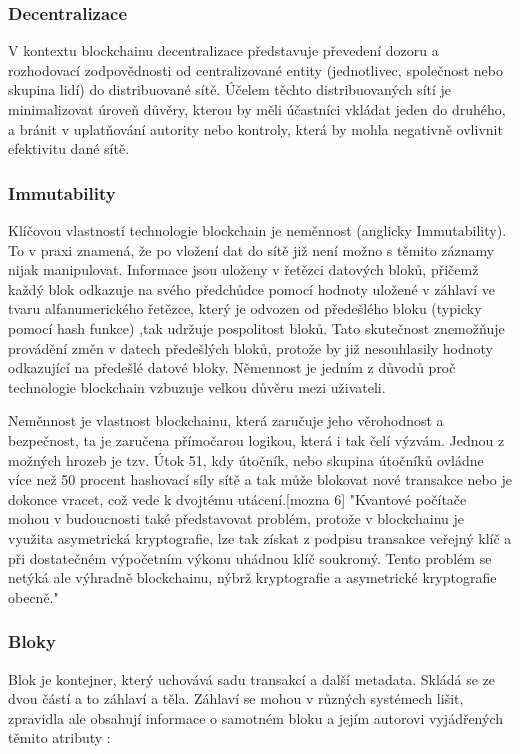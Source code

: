 \subsubsection{Decentralizace}\label{subsubsec:Decentralization}
V kontextu blockchainu decentralizace představuje převedení dozoru a rozhodovací zodpovědnosti od centralizované entity (jednotlivec, společnost nebo skupina lidí) do distribuované sítě. Účelem těchto distribuovaných sítí je minimalizovat úroveň důvěry, kterou by měli účastníci vkládat jeden do druhého, a bránit v uplatňování autority nebo kontroly, která by mohla negativně ovlivnit efektivitu dané sítě. \cite{Decentralizace-blockchainu}




\subsubsection{Immutability}\label{subsubsec:immutability}
Klíčovou vlastností technologie blockchain je neměnnost (anglicky Immutability). To v praxi znamená, že po vložení dat do sítě již není možno s těmito záznamy nijak manipulovat. Informace jsou uloženy v řetězci datových bloků, přičemž každý blok odkazuje na svého předchůdce pomocí hodnoty uložené v záhlaví ve tvaru alfanumerického řetězce, který je odvozen od předešlého bloku (typicky pomocí hash funkce) ,tak udržuje pospolitost bloků. Tato skutečnost znemožňuje provádění změn v datech předešlých bloků, protože by již nesouhlasily hodnoty odkazující na předešlé datové bloky. Němennost je jedním z důvodů proč technologie blockchain vzbuzuje velkou důvěru mezi uživateli. 

Neměnnost je vlastnost blockchainu, která zaručuje jeho věrohodnost a bezpečnost, ta je zaručena přímočarou logikou, která i tak čelí výzvám. Jednou z možných hrozeb je tzv. Útok 51, kdy útočník, nebo skupina útočníků ovládne více než 50 procent hashovací síly sítě a tak může blokovat nové transakce nebo je dokonce vracet, což vede k dvojtému utácení.[mozna 6] "Kvantové počítače mohou v budoucnosti také představovat problém, protože v blockchainu je využita asymetrická kryptografie, lze tak získat z podpisu transakce veřejný klíč a při dostatečném výpočetním výkonu uhádnou klíč soukromý. Tento problém se netýká ale výhradně blockchainu, nýbrž kryptografie a asymetrické kryptografie obecně." \cite{Imutabilita-blockchainu} \cite{hrozby-immutability}

\subsubsection{Bloky}\label{subsubsec:Bloky}
Blok je kontejner, který uchovává sadu transakcí a další metadata. Skládá se ze dvou částí a to záhlaví a těla. Záhlaví se mohou v různých systémech lišit, zpravidla ale obsahují informace o samotném bloku a jejím autorovi vyjádřených těmito atributy : 


